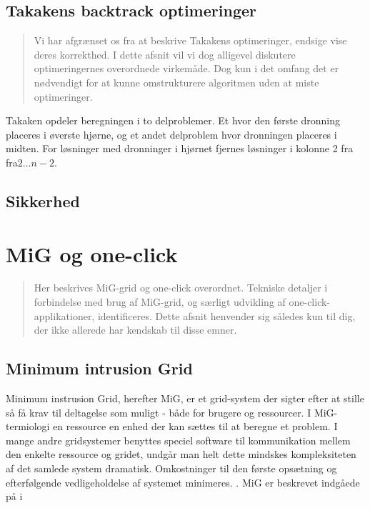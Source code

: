 \documentclass[final,a4paper,10pt]{article}
\begin{document}
\subsection{Takakens backtrack optimeringer}\label{backtrackoptimeringer}
\begin{verse}
	Vi har afgrænset os fra at beskrive Takakens optimeringer, endsige vise deres korrekthed. I dette afsnit vil vi dog alligevel diskutere optimeringernes overordnede virkemåde. Dog kun i det omfang det er nødvendigt for at kunne omstrukturere algoritmen uden at miste optimeringer.   
\end{verse}

Takaken opdeler beregningen i to delproblemer. Et hvor den første dronning placeres i øverste hjørne, og et andet delproblem hvor dronningen placeres i midten. For løsninger med dronninger i hjørnet fjernes løsninger i kolonne 2 fra fra$2 \ldots n-2$. 


\subsection{Sikkerhed}

\section{MiG og one-click}\label{migogoneclick}
\begin{verse}
	Her beskrives MiG-grid og one-click overordnet. Tekniske detaljer i forbindelse med brug af MiG-grid, og særligt udvikling af one-click-applikationer, identificeres. Dette afsnit henvender sig således kun til dig, der ikke allerede har kendskab til disse emner.  
\end{verse}

\subsection{Minimum intrusion Grid}\label{mig}

Minimum instrusion Grid, herefter MiG, er et grid-system der sigter efter at stille så få krav til deltagelse som muligt - både for brugere og ressourcer. I MiG-termiologi en ressource en enhed der kan sættes til at beregne et problem. I mange andre gridsystemer benyttes speciel software til kommunikation mellem den enkelte ressource og gridet, undgår man helt dette mindskes kompleksiteten af det samlede system dramatisk. Omkostninger til den første opsætning og efterfølgende vedligeholdelse af systemet minimeres.   . MiG er beskrevet indgåede på i \cite{simplemig,mig}
\end{document}

